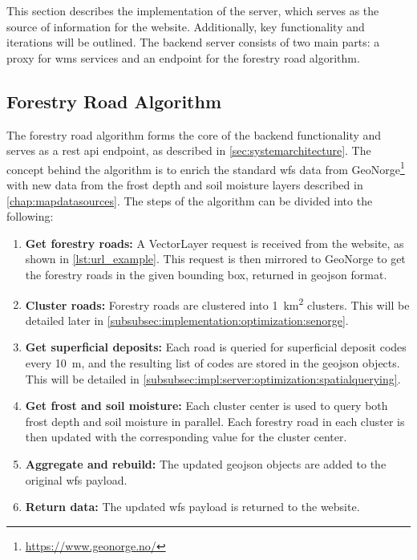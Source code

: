 This section describes the implementation of the server, which serves as the source of information for the website. Additionally, key functionality and iterations will be outlined. The backend server consists of two main parts: a proxy for \Gls{wms} services and an endpoint for the forestry road algorithm. 

\subsection{Forestry Road Algorithm}\label{subsec:server:forestroadalgorithm}

The forestry road algorithm forms the core of the backend functionality and serves as a \acrshort{rest} \acrshort{api} endpoint, as described in \autoref{sec:systemarchitecture}. The concept behind the algorithm is to enrich the standard \gls{wfs} data from GeoNorge\footnote{\url{https://www.geonorge.no/}} with new data from the frost depth and soil moisture layers described in \autoref{chap:mapdatasources}. The steps of the algorithm can be divided into the following:

\begin{enumerate}
    \item \textbf{Get forestry roads:} A VectorLayer request is received from the website, as shown in \autoref{lst:url_example}. This request is then mirrored to GeoNorge to get the forestry roads in the given bounding box, returned in \gls{geojson} format.
    \item \textbf{Cluster roads:} Forestry roads are clustered into \qty{1}{\kilo\meter\squared} clusters. This will be detailed later in \autoref{subsubsec:implementation:optimization:senorge}.
    \item \textbf{Get superficial deposits:} Each road is queried for superficial deposit codes every \qty{10}{\meter}, and the resulting list of codes are stored in the \gls{geojson} objects. This will be detailed in \autoref{subsubsec:impl:server:optimization:spatialquerying}.
    \item \textbf{Get frost and soil moisture:} Each cluster center is used to query both frost depth and soil moisture in parallel. Each forestry road in each cluster is then updated with the corresponding value for the cluster center.
    \item \textbf{Aggregate and rebuild:} The updated \gls{geojson} objects are added to the original \gls{wfs} payload.
    \item \textbf{Return data:} The updated \gls{wfs} payload is returned to the website.
\end{enumerate}

